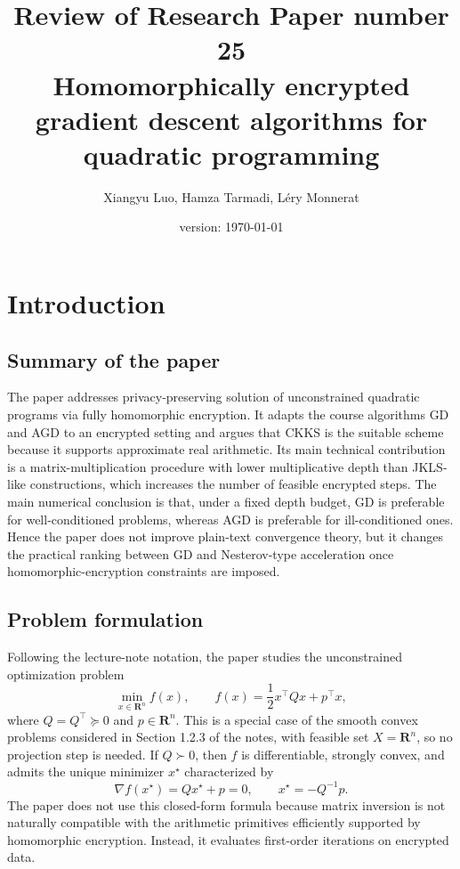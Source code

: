 \documentclass[10pt,english]{article}
\title{Review of Research Paper number 25\\ \large Homomorphically encrypted gradient descent algorithms for quadratic programming}
\date{version: \today}%
\author{Xiangyu Luo, Hamza Tarmadi, L\'ery Monnerat}
\newcommand{\reals}{\mathbf{R}}
\begin{document}
\maketitle

\section{Introduction}

\subsection{Summary of the paper}

The paper addresses privacy-preserving solution of unconstrained quadratic programs via fully homomorphic encryption. It adapts the course algorithms GD and AGD to an encrypted setting and argues that CKKS is the suitable scheme because it supports approximate real arithmetic. Its main technical contribution is a matrix-multiplication procedure with lower multiplicative depth than JKLS-like constructions, which increases the number of feasible encrypted steps. The main numerical conclusion is that, under a fixed depth budget, GD is preferable for well-conditioned problems, whereas AGD is preferable for ill-conditioned ones. Hence the paper does not improve plain-text convergence theory, but it changes the practical ranking between GD and Nesterov-type acceleration once homomorphic-encryption constraints are imposed.

\subsection{Problem formulation}

Following the lecture-note notation, the paper studies the unconstrained optimization problem
\[
\min_{x \in \reals^n} f(x),
\qquad
f(x)=\frac{1}{2}x^\top Qx + p^\top x,
\]
where $Q=Q^\top \succeq 0$ and $p \in \reals^n$. This is a special case of the smooth convex problems considered in Section 1.2.3 of the notes, with feasible set $X=\reals^n$, so no projection step is needed. If $Q \succ 0$, then $f$ is differentiable, strongly convex, and admits the unique minimizer $x^\star$ characterized by
\[
\nabla f(x^\star)=Qx^\star + p = 0,
\qquad
x^\star = -Q^{-1}p.
\]
The paper does not use this closed-form formula because matrix inversion is not naturally compatible with the arithmetic primitives efficiently supported by homomorphic encryption. Instead, it evaluates first-order iterations on encrypted data.
\end{document}

